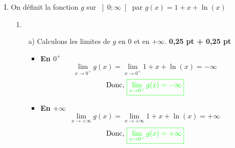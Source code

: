 \documentclass[12pt]{article}
\begin{document}
\begin{itemize}
    \item[I.] On définit la fonction $g$ sur $\left]0 ; \infty\right[$ par $g(x) = 1 + x + \ln(x)$
    \begin{itemize}
        \item[1.] 
        \begin{itemize}
            \item[a)] Calculons les limites de $g$ en 0 et en $+\infty$. \textbf{0,25 pt + 0,25 pt}
            \begin{itemize}
            \item \textbf{En $0^{+}$}
            \[\lim_{x \to 0^{+}}g(x) = \lim_{x \to 0^{+}} 1 + x + \ln(x)=-\infty\]
            \[\text{Donc, }\color{green}{\boxed{\lim_{x \to 0^{+}}g(x)=-\infty}}\]
            \item \textbf{En $+\infty$}
            \[\lim_{x \to +\infty}g(x) = \lim_{x \to +\infty} 1 + x + \ln(x)=+\infty\]
            \[\text{Donc, }\color{green}{\boxed{\lim_{x \to 0^{+}}g(x)=+\infty}}\]
            \end{itemize}
        \end{itemize}
    \end{itemize}
\end{itemize}
\end{document}
